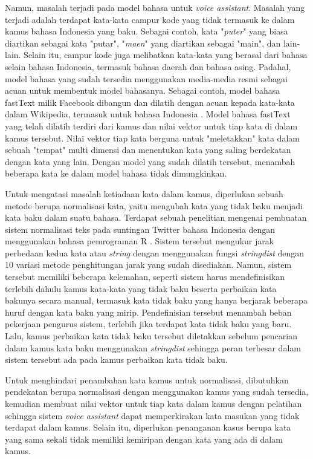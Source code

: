 Namun, masalah terjadi pada model bahasa untuk \textit{voice assistant}. Masalah yang terjadi adalah terdapat kata-kata campur kode yang tidak termasuk ke dalam kamus bahasa Indonesia yang baku. Sebagai contoh, kata "\textit{puter}" yang biasa diartikan sebagai kata "putar", "\textit{maen}" yang diartikan sebagai "main", dan lain-lain. Selain itu, campur kode juga melibatkan kata-kata yang berasal dari bahasa selain bahasa Indonesia, termasuk bahasa daerah dan bahasa asing. Padahal, model bahasa yang sudah tersedia menggunakan media-media resmi sebagai acuan untuk membentuk model bahasanya. Sebagai contoh, model bahasa fastText milik Facebook dibangun dan dilatih dengan acuan kepada kata-kata dalam Wikipedia, termasuk untuk bahasa Indonesia \parencite{bojanowski2016enriching}. Model bahasa fastText yang telah dilatih terdiri dari kamus dan nilai vektor untuk tiap kata di dalam kamus tersebut. Nilai vektor tiap kata berguna untuk "meletakkan" kata dalam sebuah "tempat" multi dimensi dan menentukan kata yang saling berdekatan dengan kata yang lain. Dengan model yang sudah dilatih tersebut, menambah beberapa kata ke dalam model bahasa tidak dimungkinkan.

Untuk mengatasi masalah ketiadaan kata dalam kamus, diperlukan sebuah metode berupa normalisasi kata, yaitu mengubah kata yang tidak baku menjadi kata baku dalam suatu bahasa. Terdapat sebuah penelitian mengenai pembuatan sistem normalisasi teks pada suntingan Twitter bahasa Indonesia dengan menggunakan bahasa pemrograman R \parencite{saragih2017normalisasi}. Sistem tersebut mengukur jarak perbedaan kedua kata atau \textit{string} dengan menggunakan fungsi \textit{stringdist} dengan 10 variasi metode penghitungan jarak yang sudah disediakan. Namun, sistem tersebut memiliki beberapa kelemahan, seperti sistem harus mendefinisikan terlebih dahulu kamus kata-kata yang tidak baku beserta perbaikan kata bakunya secara manual, termasuk kata tidak baku yang hanya berjarak beberapa huruf dengan kata baku yang mirip. Pendefinisian tersebut menambah beban pekerjaan pengurus sistem, terlebih jika terdapat kata tidak baku yang baru. Lalu, kamus perbaikan kata tidak baku tersebut diletakkan sebelum pencarian dalam kamus kata baku menggunakan \textit{stringdist} sehingga peran terbesar dalam sistem tersebut ada pada kamus perbaikan kata tidak baku.

Untuk menghindari penambahan kata kamus untuk normalisasi, dibutuhkan pendekatan berupa normalisasi dengan menggunakan kamus yang sudah tersedia, kemudian membuat nilai vektor untuk tiap kata dalam kamus dengan pelatihan sehingga sistem \textit{voice assistant} dapat memperkirakan kata masukan yang tidak terdapat dalam kamus. Selain itu, diperlukan penanganan kasus berupa kata yang sama sekali tidak memiliki kemiripan dengan kata yang ada di dalam kamus.

